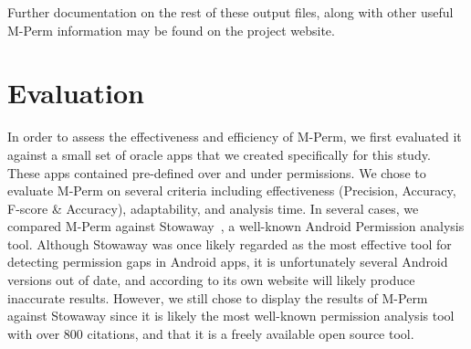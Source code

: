 \documentclass{sig-alternate-05-2015}
\begin{document}
%





Further documentation on the rest of these output files, along with other useful M-Perm information may be found on the project website.




\section{Evaluation}
\label{sec:evaluation}

In order to assess the effectiveness and efficiency of M-Perm, we first evaluated it against a small set of oracle apps that we created specifically for this study. These apps contained pre-defined over and under permissions. We chose to evaluate M-Perm on several criteria including effectiveness (Precision, Accuracy, F-score \& Accuracy), adaptability, and analysis time. In several cases, we compared M-Perm against Stowaway~\cite{Felt:2011:APD:2046707.2046779}, a well-known Android Permission analysis tool. Although Stowaway was once likely regarded as the most effective tool for detecting permission gaps in Android apps, it is unfortunately several Android versions out of date, and according to its own website will likely produce inaccurate results. However, we still chose to display the results of M-Perm against Stowaway since it is likely the most well-known permission analysis tool with over 800 citations, and that it is a freely available open source tool.
\end{document}
